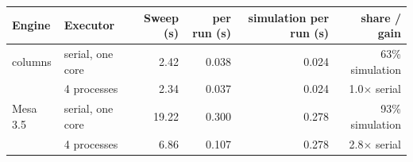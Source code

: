 \begin{tabular}{llrrrr}
\toprule
Engine & Executor & Sweep (s) & per run (s) & simulation per run (s) & share / gain \\
\midrule
columns & serial, one core & 2.42 & 0.038 & 0.024 & 63\% simulation \\
 & 4 processes & 2.34 & 0.037 & 0.024 & 1.0$\times$ serial \\
\addlinespace
Mesa 3.5 & serial, one core & 19.22 & 0.300 & 0.278 & 93\% simulation \\
 & 4 processes & 6.86 & 0.107 & 0.278 & 2.8$\times$ serial \\
\bottomrule
\end{tabular}
